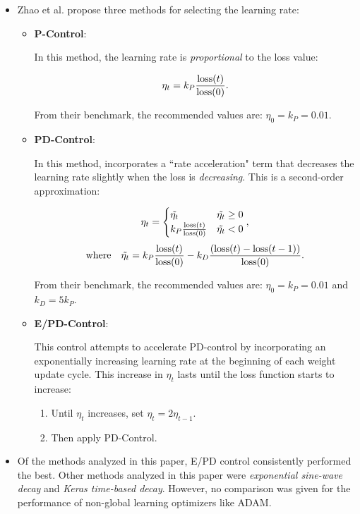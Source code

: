\documentclass[12pt]{article}
\newcommand{\loss}{\ensuremath\text{loss}}
\begin{document}
\begin{itemize}
\item Zhao et al. propose three methods for selecting the learning rate: 

\begin{itemize}
\item \textbf{P-Control}:

In this method, the learning rate is \textit{proportional} to the loss value:

$$\eta_t = k_P\frac{\loss(t)}{\loss(0)}.$$

From their benchmark, the recommended values are: $\eta_0 = k_P = 0.01$.\\

\item \textbf{PD-Control}:

In this method, incorporates a ``rate acceleration" term that decreases the learning rate slightly when the loss is \textit{decreasing}. This is a second-order approximation:


$$\eta_t = \begin{cases} 
\tilde{\eta_t} & \tilde{\eta_t} \ge 0 \\ 
k_P\frac{\loss(t)}{\loss(0)} & \tilde{\eta_t} < 0 \end{cases}, $$
$$\text{where}\quad \tilde{\eta_t} = k_P\frac{\loss(t)}{\loss(0)} - k_D\frac{(\loss(t) - \loss(t-1))}{\loss(0)}.$$

From their benchmark, the recommended values are: $\eta_0 = k_P = 0.01$ and $k_D = 5k_P$.\\

\item \textbf{E/PD-Control}:

This control attempts to accelerate PD-control by incorporating an exponentially increasing learning rate at the beginning of each weight update cycle. This increase in $\eta_t$ lasts until the loss function starts to increase:

\begin{enumerate}
\item Until $\eta_t$ increases, set $\eta_t = 2\eta_{t-1}.$
\item Then apply PD-Control.
\end{enumerate}
\end{itemize}

\item Of the methods analyzed in this paper, E/PD control consistently performed the best. Other methods analyzed in this paper were \textit{exponential sine-wave decay} and \textit{Keras time-based decay}. However, no comparison was given for the performance of non-global learning optimizers like ADAM.

\end{itemize}
\end{document}
